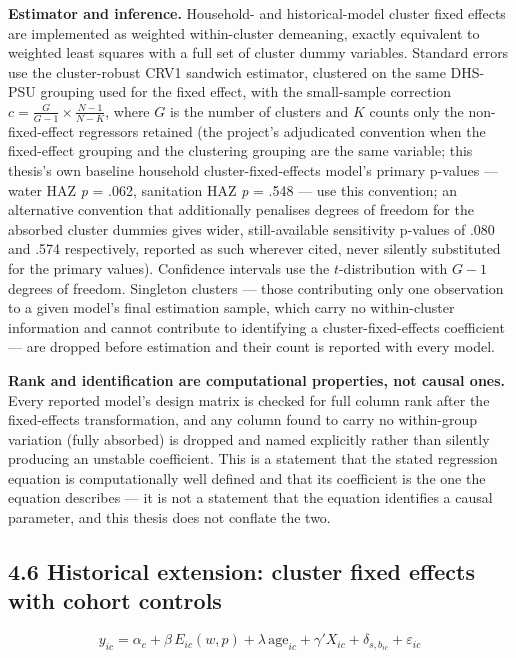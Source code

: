 \textbf{Estimator and inference.} Household- and historical-model cluster fixed effects are implemented as weighted within-cluster demeaning, exactly equivalent to weighted least squares with a full set of cluster dummy variables. Standard errors use the cluster-robust CRV1 sandwich estimator, clustered on the same DHS-PSU grouping used for the fixed effect, with the small-sample correction $c = \frac{G}{G-1}\times\frac{N-1}{N-K}$, where $G$ is the number of clusters and $K$ counts only the non-fixed-effect regressors retained (the project's adjudicated convention when the fixed-effect grouping and the clustering grouping are the same variable; this thesis's own baseline household cluster-fixed-effects model's primary p-values --- water HAZ \textit{p} = .062, sanitation HAZ \textit{p} = .548 --- use this convention; an alternative convention that additionally penalises degrees of freedom for the absorbed cluster dummies gives wider, still-available sensitivity p-values of .080 and .574 respectively, reported as such wherever cited, never silently substituted for the primary values). Confidence intervals use the $t$-distribution with $G-1$ degrees of freedom. Singleton clusters --- those contributing only one observation to a given model's final estimation sample, which carry no within-cluster information and cannot contribute to identifying a cluster-fixed-effects coefficient --- are dropped before estimation and their count is reported with every model.

\textbf{Rank and identification are computational properties, not causal ones.} Every reported model's design matrix is checked for full column rank after the fixed-effects transformation, and any column found to carry no within-group variation (fully absorbed) is dropped and named explicitly rather than silently producing an unstable coefficient. This is a statement that the stated regression equation is computationally well defined and that its coefficient is the one the equation describes --- it is not a statement that the equation identifies a causal parameter, and this thesis does not conflate the two.

\subsection*{4.6 Historical extension: cluster fixed effects with cohort controls}

$$y_{ic} = \alpha_c + \beta\,E_{ic}(w, p) + \lambda\,\text{age}_{ic} + \gamma'X_{ic} + \delta_{s,b_{ic}} + \varepsilon_{ic}$$

